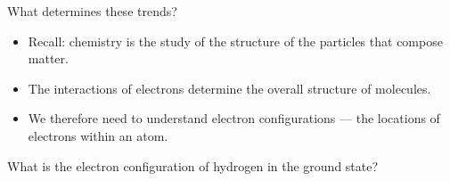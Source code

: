 \documentclass[notes=onlyslideswithnotes,notes=hide]{beamer}
\begin{document}
\begin{frame}{What determines these trends?}
	\begin{itemize}
		\item Recall: chemistry is the study of the \alert{structure} of
			the particles that compose matter.
		\item The interactions of electrons determine the overall
			structure of molecules.
		\item We therefore need to understand \alert{electron
			configurations} --- the locations of electrons within an
			atom.
	\end{itemize}

	\pause%

	\begin{example}
	What is the electron configuration of hydrogen in the ground
	state?
	\end{example}

\end{frame}
\end{document}
